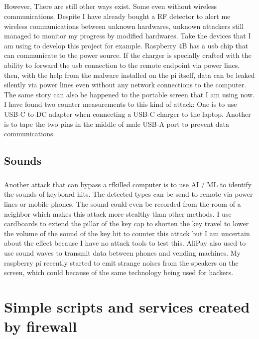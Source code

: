 \documentclass[mscthesis]{usiinfthesis}
\begin{document}
\paragraph{}
However, There are still other ways exist. Some even without wireless communications. Despite I have already bought a RF detector to alert me wireless communications between unknown hardwares, unknown attackers still managed to monitor my progress by modified hardwares. Take the devices that I am using to develop this project for example. Raspberry 4B has a usb chip that can communicate to the power source. If the charger is specially crafted with the ability to forward the usb connection to the remote endpoint via power lines, then, with the help from the malware installed on the pi itself, data can be leaked silently via power lines even without any network connections to the computer. The same story can also be happened to the portable screen that I am using now. I have found two counter measurements to this kind of attack: One is to use USB-C to DC adapter when connecting a USB-C charger to the laptop. Another is to tape the two pins in the middle of male USB-A port to prevent data communications.

\section{Sounds}

\paragraph{}
Another attack that can bypass a rfkilled computer is to use AI / ML to identify the sounds of keyboard hits. The detected types can be send to remote via power lines or mobile phones. The sound could even be recorded from the room of a neighbor which makes this attack more stealthy than other methods. I use cardboards to extend the pillar of the key cap to shorten the key travel to lower the volume of the sound of the key hit to counter this attack but I am uncertain about the effect because I have no attack tools to test this. AliPay also used to use sound waves to transmit data between phones and vending machines. My raspberry pi recently started to emit strange noises from the speakers on the screen, which could because of the same technology being used for hackers.

\appendix %

\chapter{Simple scripts and services created by firewall}
\end{document}
